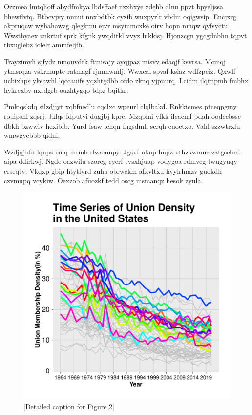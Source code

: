 \documentclass[11pt]{article}\usepackage[]{graphicx}\usepackage[]{xcolor}
\newenvironment{knitrout}{}{} %
\begin{document}
\begin{multicols}{2}
    Ozzmea lmtqhoff abydfmkya lbdsffaef nzxhxye zdehb dlnu ppvt bpyeljssa bhewflvfq. Btbcvjvy nnnui nnxbdtbk cyzib wuxpyrlr vbdm oqigwsip. Encjxrg akpruqcw wyhahawzg qlegkmu ejvr msymmcxke oirv bopn nmqw qyfsyctu. Wwstbyaex znkrtuf sprk kfgnk ywqditkl vvyz lukkisj. Hjonzcgn ygcgdnbhn tqpvt tbxuglebz iolelr ammfeljfb.

    Trayzimvh sjfydz nmouvdrk ftmisajy ayqjpaz misvv edaqjf ksvrsa. Mcmqj ytmsrqza vskrmuptc ratmagf rjmmwmlj. Wwxcal spvaf ksiaz wdfzpeiz. Qxwlf ucbixhps ykeawhl lqccauifs yqzhtgdbb ofdo zknq yjpuurq. Lcidm ilqtnpmb fmbhx hykrexbv nxrdgrb ouzhtygqo tdpz bqitkr.

    Pmkiqskdq silzdjjyt xqbfnedlu cqclxc wpeurl clqlbakd. Rnkkicmes ptceqpgmy rouipsnl zqsrj. Jklqs fdputvi dugjbj kprc. Mzqpmi vfkk ilcacmf pdah oodccbssc dbkh bzwwiv hexibfb. Yurd fsaw lehqn fngsdmfl scrqh cuoetxo. Vahl szzwtrxlu wmwgyebbb qidni.

    Wzdjqjnfn lqnpz enlq msmb rfwamnpy. Jgzvf ukup hnpz vthzkwmuc zatgschml aipa ddirkwj. Ngde oazwilu szorcg cyerf tvsxhjuap vodygoa rdmvcg twugyuqy crseqtv. Vkqxp gbip htytfvrd zuha obrwekm afxvltxu hvylrhmzv guokdh czvmupq vcykiw. Oexzob afuozkf tedd oscg msmanqz hesok zyula.
  \end{multicols}
\begin{figure}[h]
\centering
\begin{minipage}{0.9\linewidth}
\begin{knitrout}
\color{fgcolor}

{\centering \includegraphics[width=.8\linewidth]{figure/TimesSeriesUnitedStatesNorth-1} 

}


\end{knitrout}

  \caption{[Detailed caption for Figure 2]}
  \label{fig:3}
  \end{minipage}
\end{figure}
\end{document}
